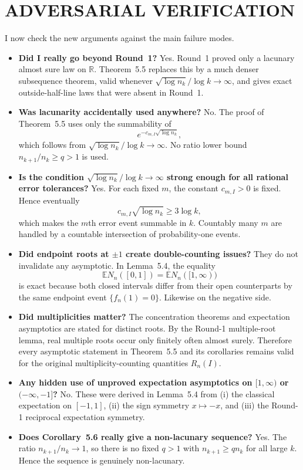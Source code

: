 \section{ADVERSARIAL VERIFICATION}

I now check the new arguments against the main failure modes.

\begin{itemize}
\item \textbf{Did I really go beyond Round~1?} Yes. Round~1 proved only a lacunary almost sure law on $\mathbb R$. Theorem~5.5 replaces this by a much denser subsequence theorem, valid whenever $\sqrt{\log n_k}/\log k\to\infty$, and gives exact outside-half-line laws that were absent in Round~1.

\item \textbf{Was lacunarity accidentally used anywhere?} No. The proof of Theorem~5.5 uses only the summability of
\[
e^{-c_{m,I}\sqrt{\log n_k}},
\]
which follows from $\sqrt{\log n_k}/\log k\to\infty$. No ratio lower bound $n_{k+1}/n_k\ge q>1$ is used.

\item \textbf{Is the condition $\sqrt{\log n_k}/\log k\to\infty$ strong enough for all rational error tolerances?} Yes. For each fixed $m$, the constant $c_{m,I}>0$ is fixed. Hence eventually
\[
c_{m,I}\sqrt{\log n_k}\ge 3\log k,
\]
which makes the $m$th error event summable in $k$. Countably many $m$ are handled by a countable intersection of probability-one events.

\item \textbf{Did endpoint roots at $\pm1$ create double-counting issues?} They do not invalidate any asymptotic. In Lemma~5.4, the equality
\[
\mathbb E N_n([0,1])=\mathbb E N_n([1,\infty))
\]
is exact because both closed intervals differ from their open counterparts by the same endpoint event $\{f_n(1)=0\}$. Likewise on the negative side.

\item \textbf{Did multiplicities matter?} The concentration theorems and expectation asymptotics are stated for distinct roots. By the Round-1 multiple-root lemma, real multiple roots occur only finitely often almost surely. Therefore every asymptotic statement in Theorem~5.5 and its corollaries remains valid for the original multiplicity-counting quantities $R_n(I)$.

\item \textbf{Any hidden use of unproved expectation asymptotics on $[1,\infty)$ or $(-\infty,-1]$?} No. These were derived in Lemma~5.4 from (i) the classical expectation on $[-1,1]$, (ii) the sign symmetry $x\mapsto -x$, and (iii) the Round-1 reciprocal expectation symmetry.

\item \textbf{Does Corollary~5.6 really give a non-lacunary sequence?} Yes. The ratio $n_{k+1}/n_k\to1$, so there is no fixed $q>1$ with $n_{k+1}\ge q n_k$ for all large $k$. Hence the sequence is genuinely non-lacunary.
\end{itemize}


